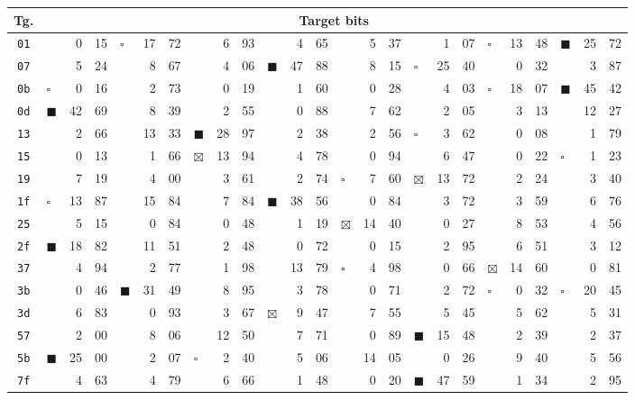 \begin{tabular}{| c | l@{\;} r@{.}l | l@{\;} r@{.}l | l@{\;} r@{.}l | l@{\;} r@{.}l | l@{\;} r@{.}l | l@{\;} r@{.}l | l@{\;} r@{.}l | l@{\;} r@{.}l |}
	\hline
	Tg. & \multicolumn{24}{c|}{Target bits} \\
	\hline
	{\tt 01}&\quad&0&15&$\square$&17&72&\quad&6&93&\quad&4&65&\quad&5&37&\quad&1&07&$\square$&13&48&$\blacksquare$&25&72\\
	\hline
	{\tt 07}&\quad&5&24&\quad&8&67&\quad&4&06&$\blacksquare$&47&88&\quad&8&15&$\square$&25&40&\quad&0&32&\quad&3&87\\
	\hline
	{\tt 0b}&$\square$&0&16&\quad&2&73&\quad&0&19&\quad&1&60&\quad&0&28&\quad&4&03&$\square$&18&07&$\blacksquare$&45&42\\
	\hline
	{\tt 0d}&$\blacksquare$&42&69&\quad&8&39&\quad&2&55&\quad&0&88&\quad&7&62&\quad&2&05&\quad&3&13&\quad&12&27\\
	\hline
	{\tt 13}&\quad&2&66&\quad&13&33&$\blacksquare$&28&97&\quad&2&38&\quad&2&56&$\square$&3&62&\quad&0&08&\quad&1&79\\
	\hline
	{\tt 15}&\quad&0&13&\quad&1&66&$\boxtimes$&13&94&\quad&4&78&\quad&0&94&\quad&6&47&\quad&0&22&$\square$&1&23\\
	\hline
	{\tt 19}&\quad&7&19&\quad&4&00&\quad&3&61&\quad&2&74&$\square$&7&60&$\boxtimes$&13&72&\quad&2&24&\quad&3&40\\
	\hline
	{\tt 1f}&$\square$&13&87&\quad&15&84&\quad&7&84&$\blacksquare$&38&56&\quad&0&84&\quad&3&72&\quad&3&59&\quad&6&76\\
	\hline
	{\tt 25}&\quad&5&15&\quad&0&84&\quad&0&48&\quad&1&19&$\boxtimes$&14&40&\quad&0&27&\quad&8&53&\quad&4&56\\
	\hline
	{\tt 2f}&$\blacksquare$&18&82&\quad&11&51&\quad&2&48&\quad&0&72&\quad&0&15&\quad&2&95&\quad&6&51&\quad&3&12\\
	\hline
	{\tt 37}&\quad&4&94&\quad&2&77&\quad&1&98&\quad&13&79&$\square$&4&98&\quad&0&66&$\boxtimes$&14&60&\quad&0&81\\
	\hline
	{\tt 3b}&\quad&0&46&$\blacksquare$&31&49&\quad&8&95&\quad&3&78&\quad&0&71&\quad&2&72&$\square$&0&32&$\square$&20&45\\
	\hline
	{\tt 3d}&\quad&6&83&\quad&0&93&\quad&3&67&$\boxtimes$&9&47&\quad&7&55&\quad&5&45&\quad&5&62&\quad&5&31\\
	\hline
	{\tt 57}&\quad&2&00&\quad&8&06&\quad&12&50&\quad&7&71&\quad&0&89&$\blacksquare$&15&48&\quad&2&39&\quad&2&37\\
	\hline
	{\tt 5b}&$\blacksquare$&25&00&\quad&2&07&$\square$&2&40&\quad&5&06&\quad&14&05&\quad&0&26&\quad&9&40&\quad&5&56\\
	\hline
	{\tt 7f}&\quad&4&63&\quad&4&79&\quad&6&66&\quad&1&48&\quad&0&20&$\blacksquare$&47&59&\quad&1&34&\quad&2&95\\
	\hline
\end{tabular}